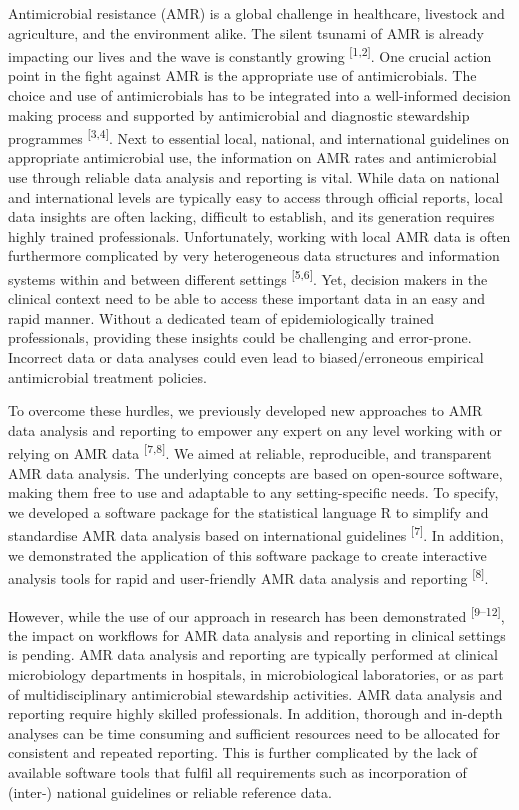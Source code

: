 \documentclass[
]{book}
\begin{document}
Antimicrobial resistance (AMR) is a global challenge in healthcare, livestock and agriculture, and the environment alike. The silent tsunami of AMR is already impacting our lives and the wave is constantly growing \textsuperscript{{[}1,2{]}}. One crucial action point in the fight against AMR is the appropriate use of antimicrobials. The choice and use of antimicrobials has to be integrated into a well-informed decision making process and supported by antimicrobial and diagnostic stewardship programmes \textsuperscript{{[}3,4{]}}. Next to essential local, national, and international guidelines on appropriate antimicrobial use, the information on AMR rates and antimicrobial use through reliable data analysis and reporting is vital. While data on national and international levels are typically easy to access through official reports, local data insights are often lacking, difficult to establish, and its generation requires highly trained professionals. Unfortunately, working with local AMR data is often furthermore complicated by very heterogeneous data structures and information systems within and between different settings \textsuperscript{{[}5,6{]}}. Yet, decision makers in the clinical context need to be able to access these important data in an easy and rapid manner. Without a dedicated team of epidemiologically trained professionals, providing these insights could be challenging and error-prone. Incorrect data or data analyses could even lead to biased/erroneous empirical antimicrobial treatment policies.

To overcome these hurdles, we previously developed new approaches to AMR data analysis and reporting to empower any expert on any level working with or relying on AMR data \textsuperscript{{[}7,8{]}}. We aimed at reliable, reproducible, and transparent AMR data analysis. The underlying concepts are based on open-source software, making them free to use and adaptable to any setting-specific needs. To specify, we developed a software package for the statistical language R to simplify and standardise AMR data analysis based on international guidelines \textsuperscript{{[}7{]}}. In addition, we demonstrated the application of this software package to create interactive analysis tools for rapid and user-friendly AMR data analysis and reporting \textsuperscript{{[}8{]}}.

However, while the use of our approach in research has been demonstrated \textsuperscript{{[}9--12{]}}, the impact on workflows for AMR data analysis and reporting in clinical settings is pending. AMR data analysis and reporting are typically performed at clinical microbiology departments in hospitals, in microbiological laboratories, or as part of multidisciplinary antimicrobial stewardship activities. AMR data analysis and reporting require highly skilled professionals. In addition, thorough and in-depth analyses can be time consuming and sufficient resources need to be allocated for consistent and repeated reporting. This is further complicated by the lack of available software tools that fulfil all requirements such as incorporation of (inter-) national guidelines or reliable reference data.
\end{document}
